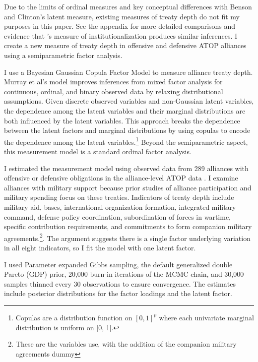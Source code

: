 \documentclass[12pt]{article}
\begin{document}
Due to the limits of ordinal measures and key conceptual differences with Benson and Clinton's latent measure, existing measures of treaty depth do not fit my purposes in this paper. 
See the appendix for more detailed comparisons and evidence that \citet{LeedsAnac2005}'s measure of institutionalization produces similar inferences. 
I create a new measure of treaty depth in offensive and defensive ATOP alliances using a semiparametric factor analysis. 


I use a Bayesian Gaussian Copula Factor Model \citep{Murrayetal2013} to measure alliance treaty depth. 
Murray et al's model improves inferences from mixed factor analysis for continuous, ordinal, and binary observed data by relaxing distributional assumptions.
Given discrete observed variables and non-Gaussian latent variables, the dependence among the latent variables and their marginal distributions are both influenced by the latent variables.
This approach breaks the dependence between the latent factors and marginal distributions by using copulas to encode the dependence among the latent variables.\footnote{Copulas are a distribution function on $[0, 1]^p$ where each univariate marginal distribution is uniform on [0, 1].}
Beyond the semiparametric aspect, this measurement model is a standard ordinal factor analysis.


I estimated the measurement model using observed data from 289 alliances with offensive or defensive obligations in the alliance-level ATOP data \citep{Leedsetal2002}. 
I examine alliances with military support because prior studies of alliance participation and military spending focus on these treaties.
Indicators of treaty depth include military aid, bases, international organization formation, integrated military command, defense policy coordination, subordination of forces in wartime, specific contribution requirements, and commitments to form companion military agreements.\footnote{These are the variables \citet{LeedsAnac2005} use, with the addition of the companion military agreements dummy}. 
The argument suggests there is a single factor underlying variation in all eight indicators, so I fit the model with one latent factor. 


I used Parameter expanded Gibbs sampling, the default generalized double Pareto (GDP) prior, 20,000 burn-in iterations of the MCMC chain, and 30,000 samples thinned every 30 observations to ensure convergence. 
The estimates include posterior distributions for the factor loadings and the latent factor. 
\end{document}
